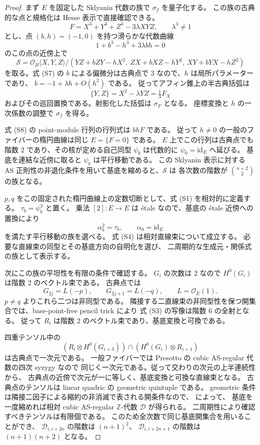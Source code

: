 \begin{proof}
まず $E$ を固定した Sklyanin 代数の族で $\sigma_f$ を量子化する。
この族の古典的な点と規格化は Hesse 表示で直接確認できる。
\[
 F=X^3+Y^3+Z^3-3\lambda XYZ,\qquad \lambda^3\ne1
\]
とし、点 $(b,h)=(-1,0)$ を持つ滑らかな代数曲線
\[
 1+b^3-h^3+3\lambda bh=0
 \tag{S7}
\]
のこの点の近傍上で
\[
 \mathcal S=
 \mathcal O_B\langle X,Y,Z\rangle/
 (YZ+bZY-hX^2,\ ZX+bXZ-hY^2,\ XY+bYX-hZ^2)
 \tag{S8}
\]
を取る。式 (S7) の $b$ による偏微分は古典点で $3$ なので、$h$ は局所パラメーターであり、
$b=-1+\lambda h+O(h^2)$ である。
従ってアフィン錐上の半古典括弧は
\[
 \{Y,Z\}=X^2-\lambda YZ=\tfrac13F_X
\]
およびその巡回置換である。射影化した括弧は $\sigma_F$ となる。
座標変換と $h$ の一次係数の調整で $\sigma_f$ を得る。

式 (S8) の point-module 行列の行列式は $bhF$ である。
従って $h\ne0$ の一般のファイバーの楕円曲線は同じ $E=\{F=0\}$ である。
$E$ 上でこの行列は古典点でも階数 $2$ であり、その核が定める自己同型
$\psi_b$ は代数的に $\psi_0=\mathrm{id}_E$ へ延びる。
基底を連結な近傍に取ると $\psi_b$ は平行移動である。
この Sklyanin 表示に対する AS 正則性の非退化条件を用いて基底を縮めると、$\mathcal S$ は
各次数の階数が $\binom{n+2}{2}$ の族となる。

$p,q$ をこの固定された楕円曲線上の定数切断として、式 (S1) を相対的に定義する。
$\tau_b=\psi_b^3$ と置く。
乗法 $[2]\colon E\to E$ は \'etale なので、基底の \'etale 近傍への置換により
\[
 \alpha_b^2=\tau_b,\qquad\alpha_0=\mathrm{id}_E
\]
を満たす平行移動の族を選べる。
式 (S4) は相対直線束について成立する。
必要な直線束の同型とその基底方向の自明化を選び、
二周期的な生成元・関係式の族として表示する。

次にこの族の平坦性を有限の条件で確認する。
$G_i$ の次数は $2$ なので $H^0(G_i)$ は階数 $2$ のベクトル束である。
古典点では
\[
 G_{2j}=L(-p),\qquad G_{2j+1}=L(-q),\qquad L=\mathcal O_E(1).
 \tag{S9}
\]
$p\ne q$ よりこれら二つは非同型である。
隣接する二直線束の非同型性を保つ開集合では、base-point-free pencil trick により
式 (S3) の写像は階数 $6$ の全射となる。
従って $R_i$ は階数 $2$ のベクトル束であり、基底変換と可換である。

四重テンソル中の
\[
 (R_i\otimes H^0(G_{i+3}))\cap(H^0(G_i)\otimes R_{i+1})
 \tag{S10}
\]
は古典点で一次元である。
一般ファイバーでは Presotto の cubic AS-regular 代数の四次 syzygy なので
同じく一次元である。従って交わりの次元の上半連続性から、
古典点の近傍で次元が一に等しく、基底変換と可換な直線束となる。
古典点のテンソルは linear quadric の geometric quintuple である。
geometric 条件は隣接二因子による縮約の非消滅で表される開条件なので、
\cite[\S5.2、定義5.3.1、定理5.5.10]{VdBQuadrics} によって、
基底を一度縮めれば相対 cubic AS-regular $\mathbb Z$-代数 $\mathcal D$ が得られる。
二周期性により確認すべきテンソルは有限個である。
このため全次数で同じ基底開集合を用いることができ、
$\mathcal D_{i,i+2n}$ の階数は $(n+1)^2$、
$\mathcal D_{i,i+2n+1}$ の階数は $(n+1)(n+2)$ となる。


\end{proof}
